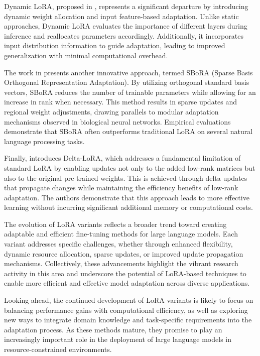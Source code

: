 \documentclass[conference]{IEEEtran}
\begin{document}
Dynamic LoRA, proposed in \cite{b3}, represents a significant departure by introducing dynamic weight allocation and input feature-based adaptation. Unlike static approaches, Dynamic LoRA evaluates the importance of different layers during inference and reallocates parameters accordingly. Additionally, it incorporates input distribution information to guide adaptation, leading to improved generalization with minimal computational overhead.

The work in \cite{b4} presents another innovative approach, termed SBoRA (Sparse Basis Orthogonal Representation Adaptation). By utilizing orthogonal standard basis vectors, SBoRA reduces the number of trainable parameters while allowing for an increase in rank when necessary. This method results in sparse updates and regional weight adjustments, drawing parallels to modular adaptation mechanisms observed in biological neural networks. Empirical evaluations demonstrate that SBoRA often outperforms traditional LoRA on several natural language processing tasks.

Finally, \cite{b5} introduces Delta-LoRA, which addresses a fundamental limitation of standard LoRA by enabling updates not only to the added low-rank matrices but also to the original pre-trained weights. This is achieved through delta updates that propagate changes while maintaining the efficiency benefits of low-rank adaptation. The authors demonstrate that this approach leads to more effective learning without incurring significant additional memory or computational costs.

The evolution of LoRA variants reflects a broader trend toward creating adaptable and efficient fine-tuning methods for large language models. Each variant addresses specific challenges, whether through enhanced flexibility, dynamic resource allocation, sparse updates, or improved update propagation mechanisms. Collectively, these advancements highlight the vibrant research activity in this area and underscore the potential of LoRA-based techniques to enable more efficient and effective model adaptation across diverse applications.

Looking ahead, the continued development of LoRA variants is likely to focus on balancing performance gains with computational efficiency, as well as exploring new ways to integrate domain knowledge and task-specific requirements into the adaptation process. As these methods mature, they promise to play an increasingly important role in the deployment of large language models in resource-constrained environments.
\end{document}
